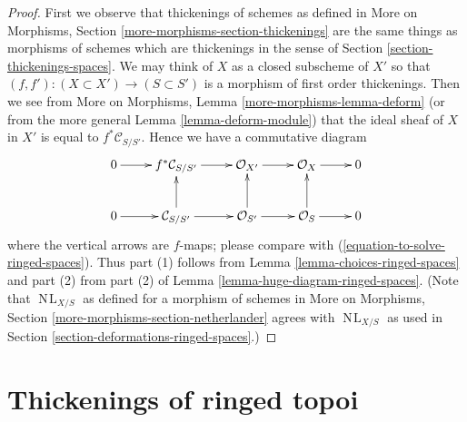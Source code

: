 \documentclass{stacks-project}
\theoremstyle{plain}
\theoremstyle{definition}
\theoremstyle{remark}
\numberwithin{equation}{subsection}
\def\NL{\mathop{N\!L}\nolimits}
\begin{document}
\begin{proof}
First we observe that thickenings of schemes as defined in
More on Morphisms, Section \ref{more-morphisms-section-thickenings}
are the same things as morphisms of schemes which
are thickenings in the sense of
Section \ref{section-thickenings-spaces}.
We may think of $X$ as a closed subscheme of $X'$
so that $(f, f') : (X \subset X') \to (S \subset S')$
is a morphism of first order thickenings. Then we see
from More on Morphisms, Lemma \ref{more-morphisms-lemma-deform}
(or from the more general Lemma \ref{lemma-deform-module})
that the ideal sheaf of $X$ in $X'$ is equal to $f^*\mathcal{C}_{S/S'}$.
Hence we have a commutative diagram
$$
\xymatrix{
0 \ar[r] & f^*\mathcal{C}_{S/S'} \ar[r] &
\mathcal{O}_{X'} \ar[r] &
\mathcal{O}_X \ar[r] & 0 \\
0 \ar[r] & \mathcal{C}_{S/S'} \ar[u] \ar[r] &
\mathcal{O}_{S'} \ar[u] \ar[r] &
\mathcal{O}_S \ar[u] \ar[r] & 0
}
$$
where the vertical arrows are $f$-maps; please compare with
(\ref{equation-to-solve-ringed-spaces}).
Thus part (1) follows from
Lemma \ref{lemma-choices-ringed-spaces}
and part (2) from part (2) of
Lemma \ref{lemma-huge-diagram-ringed-spaces}.
(Note that $\NL_{X/S}$ as defined for a morphism of schemes in
More on Morphisms, Section \ref{more-morphisms-section-netherlander}
agrees with $\NL_{X/S}$ as used in
Section \ref{section-deformations-ringed-spaces}.)
\end{proof}










\section{Thickenings of ringed topoi}
\label{section-thickenings-ringed-topoi}
\end{document}
